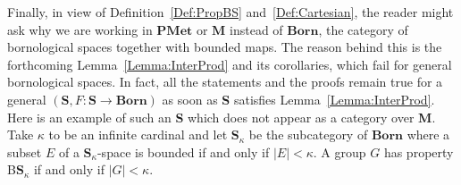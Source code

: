 \documentclass[a4paper]{article}
\newtheorem{prop}[lem]{Proposition}
\theoremstyle{definition}
\newtheorem{rem}[lem]{Remark}
\newcommand*{\category}[1]{\textbf{#1}}
\newcommand*{\PMet}{\category{PMet}}
\newcommand*{\CatS}{\category{S}}
\newcommand*{\BS}{B\textbf{S}}
\begin{document}
Finally, in view of Definition~\ref{Def:PropBS} and~\ref{Def:Cartesian}, the reader might ask why we are working in $\PMet$ or $\category{M}$ instead of $\category{Born}$, the category of bornological spaces together with bounded maps.
The reason behind this is the forthcoming Lemma~\ref{Lemma:InterProd} and its corollaries, which fail for general bornological spaces.
In fact, all the statements and the proofs remain true for a general $(\CatS,F\colon\CatS\to \category{Born})$ as soon as \CatS{} satisfies Lemma~\ref{Lemma:InterProd}.
Here is an example of such an \CatS{} which does not appear as a category over \category{M}.
Take $\kappa$ to be an infinite cardinal and let $\mathbf{S}_\kappa$ be the subcategory of $\category{Born}$ where a subset $E$ of a $\mathbf{S}_\kappa$-space is bounded if and only if $\lvert E\rvert<\kappa$.
A group $G$ has property B$\mathbf{S}_\kappa$ if and only if $\lvert G\rvert<\kappa$.
%
%
%
%
\end{document}
